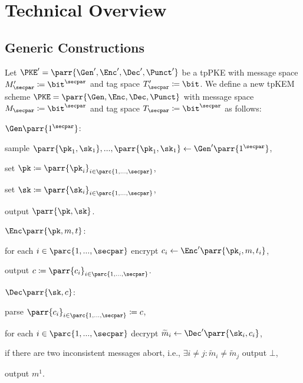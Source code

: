 \section{Technical Overview}
\label{sec:overview}


\subsection{Generic Constructions}

\begin{construction}\label{con:sel-to-ad}
    Let \(\PKE' = \parr{\Gen',\Enc',\Dec',\Punct'}\) be a tpPKE with message space \(M'_\secpar \coloneqq \bit^\secpar\) and tag space \(T'_\secpar \coloneqq \bit\).
    We define a new tpKEM scheme \(\PKE = \parr{\Gen,\Enc,\Dec,\Punct}\) with message space \(M_\secpar \coloneqq \bit^\secpar\) and tag space \(T_\secpar \coloneqq \bit^\secpar\) as follows:
    \begin{sitemize}
        \item \(\Gen\parr{1^\secpar}\):
        \begin{sitemize}
            \item sample \(\parr{\pk_1,\sk_1}, ..., \parr{\pk_1,\sk_1} \gets \Gen'\parr{1^\secpar}\),
            \item set \(\pk \coloneqq \parr{\pk_i}_{i \in \parc{1,...,\secpar}}\),
            \item set \(\sk \coloneqq \parr{\sk_i}_{i \in \parc{1,...,\secpar}}\),
            \item output \(\parr{\pk,\sk}\).
        \end{sitemize}

        \item \(\Enc\parr{\pk,m,t}\):
        \begin{sitemize}
            \item for each \(i \in \parc{1,...,\secpar}\) encrypt \(c_i \gets \Enc'\parr{\pk_i,m,t_i}\),
            \item output \(c \coloneqq \parr{c_i}_{i \in \parc{1,...,\secpar}}\).
        \end{sitemize}

        \item \(\Dec\parr{\sk,c}\):
        \begin{sitemize}
            \item parse \(\parr{c_i}_{i \in \parc{1,...,\secpar}} \coloneqq c\),
            \item for each \(i \in \parc{1,...,\secpar}\) decrypt \(\widetilde{m}_i \gets \Dec'\parr{\sk_i,c_i}\),
            \item if there are two inconsistent messages abort, i.e., \(\exists i \neq j : \widetilde{m}_i \neq \widetilde{m}_j\) output \(\bot\),
            \item output \(m^1\).
        \end{sitemize}


\end{sitemize}
\end{construction}
